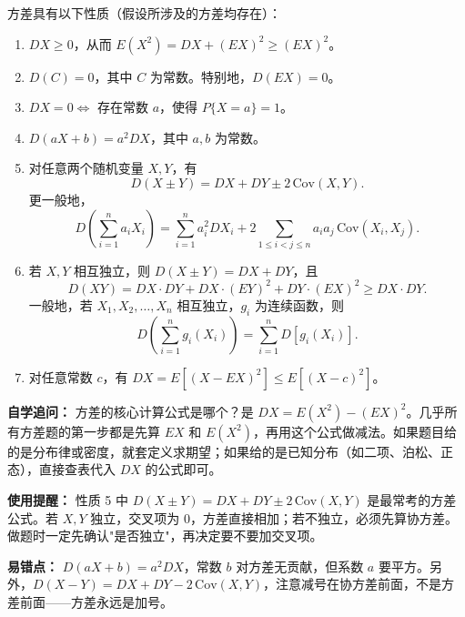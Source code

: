 ﻿\documentclass[lang=cn,11pt]{elegantbook}
\begin{document}
\begin{property}\label{prop:variance}
方差具有以下性质（假设所涉及的方差均存在）：
\begin{enumerate}
    \item \(DX \geqslant 0\)，从而 \(E(X^2) = DX + (EX)^2 \geqslant (EX)^2\)。
    \item \(D(C) = 0\)，其中 \(C\) 为常数。特别地，\(D(EX) = 0\)。
    \item \(DX = 0 \Leftrightarrow\) 存在常数 \(a\)，使得 \(P\{X = a\} = 1\)。
    \item \(D(aX + b) = a^2 DX\)，其中 \(a, b\) 为常数。
    \item 对任意两个随机变量 \(X, Y\)，有
    \[
    D(X \pm Y) = DX + DY \pm 2\,\mathrm{Cov}(X,Y).
    \]
    更一般地，
    \[
    D\!\left(\sum_{i=1}^{n} a_i X_i\right) = \sum_{i=1}^{n} a_i^2 DX_i + 2\sum_{1 \leqslant i < j \leqslant n} a_i a_j\,\mathrm{Cov}(X_i,X_j).
    \]
    \item 若 \(X, Y\) 相互独立，则 \(D(X \pm Y) = DX + DY\)，且
    \[
    D(XY) = DX \cdot DY + DX \cdot (EY)^2 + DY \cdot (EX)^2 \geqslant DX \cdot DY.
    \]
    一般地，若 \(X_1, X_2, \dots, X_n\) 相互独立，\(g_i\) 为连续函数，则
    \[
    D\!\left(\sum_{i=1}^{n} g_i(X_i)\right) = \sum_{i=1}^{n} D[g_i(X_i)].
    \]
    \item 对任意常数 \(c\)，有 \(DX = E[(X - EX)^2] \leqslant E[(X - c)^2]\)。
\end{enumerate}
\end{property}

\begin{note}
\textbf{自学追问：} 方差的核心计算公式是哪个？是 $DX = E(X^2) - (EX)^2$。几乎所有方差题的第一步都是先算 $EX$ 和 $E(X^2)$，再用这个公式做减法。如果题目给的是分布律或密度，就套定义求期望；如果给的是已知分布（如二项、泊松、正态），直接查表代入 $DX$ 的公式即可。

\textbf{使用提醒：} 性质 5 中 $D(X \pm Y) = DX + DY \pm 2\,\mathrm{Cov}(X,Y)$ 是最常考的方差公式。若 $X,Y$ 独立，交叉项为 $0$，方差直接相加；若不独立，必须先算协方差。做题时一定先确认"是否独立"，再决定要不要加交叉项。

\textbf{易错点：} $D(aX+b) = a^2 DX$，常数 $b$ 对方差无贡献，但系数 $a$ 要平方。另外，$D(X-Y) = DX + DY - 2\,\mathrm{Cov}(X,Y)$，注意减号在协方差前面，不是方差前面——方差永远是加号。
\end{note}
\end{document}
